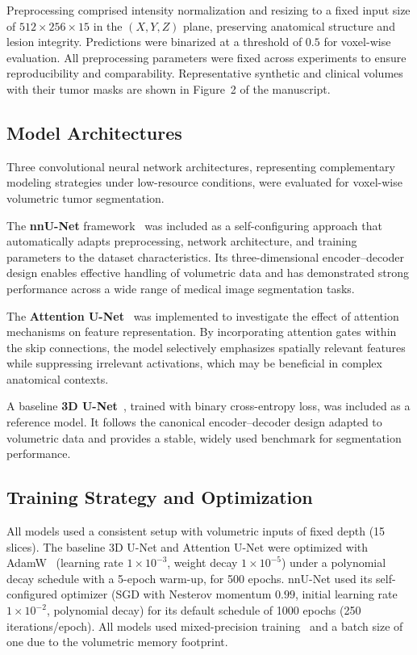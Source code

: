 \documentclass[11pt]{article}
\begin{document}
Preprocessing comprised intensity normalization and resizing to a fixed input size
of $512\times256\times15$ in the $(X,Y,Z)$ plane, preserving anatomical structure
and lesion integrity. Predictions were binarized at a threshold of $0.5$ for
voxel-wise evaluation. All preprocessing parameters were fixed across experiments to
ensure reproducibility and comparability. Representative synthetic and clinical
volumes with their tumor masks are shown in Figure~2 of the manuscript.

\subsection{Model Architectures}
Three convolutional neural network architectures, representing complementary modeling
strategies under low-resource conditions, were evaluated for voxel-wise volumetric
tumor segmentation.

The \textbf{nnU-Net} framework~\cite{isensee2021,isensee2018} was included as a
self-configuring approach that automatically adapts preprocessing, network
architecture, and training parameters to the dataset characteristics. Its
three-dimensional encoder--decoder design enables effective handling of volumetric
data and has demonstrated strong performance across a wide range of medical image
segmentation tasks.

The \textbf{Attention U-Net}~\cite{oktay2018} was implemented to investigate the
effect of attention mechanisms on feature representation. By incorporating attention
gates within the skip connections, the model selectively emphasizes spatially relevant
features while suppressing irrelevant activations, which may be beneficial in complex
anatomical contexts.

A baseline \textbf{3D U-Net}~\cite{cicek2016}, trained with binary cross-entropy loss,
was included as a reference model. It follows the canonical encoder--decoder design
adapted to volumetric data and provides a stable, widely used benchmark for
segmentation performance.

\subsection{Training Strategy and Optimization}
All models used a consistent setup with volumetric inputs of fixed depth (15
slices). The baseline 3D U-Net and Attention U-Net were optimized with
AdamW~\cite{loshchilov2017} (learning rate $1\times10^{-3}$, weight decay
$1\times10^{-5}$) under a polynomial decay schedule with a 5-epoch warm-up, for 500
epochs. nnU-Net used its
self-configured optimizer (SGD with Nesterov momentum $0.99$, initial learning rate
$1\times10^{-2}$, polynomial decay) for its default schedule of 1000 epochs (250
iterations/epoch). All models used mixed-precision training~\cite{micikevicius2017}
and a batch size of one due to the volumetric memory footprint.
\end{document}
